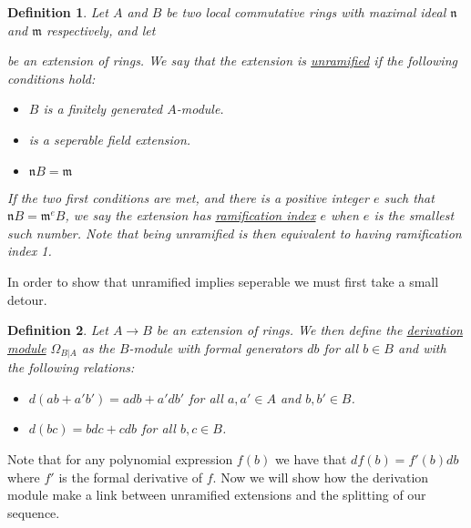 \documentclass[11pt, a4paper, english]{article}
\numberwithin{prop}{section}
\numberwithin{lemma}{section}
\numberwithin{theorem}{section}
\newtheorem{defin}{Definition}
\numberwithin{defin}{section}
\numberwithin{example}{section}
\begin{document}
\begin{defin}
Let $A$ and $B$ be two local commutative rings with maximal ideal $\mathfrak{n}$ and $\mathfrak{m}$ respectively, and let 
be an extension of rings. We say that the extension is \underline{unramified} if the following conditions hold:
\begin{itemize}
\item $B$ is a finitely generated $A$-module.
\item {}
is a seperable field extension.
\item $\mathfrak{n}B = \mathfrak{m}$
\end{itemize}
If the two first conditions are met, and there is a positive integer $e$ such that $\mathfrak{n} B = \mathfrak{m}^e B$, we say the extension has \underline{ramification index} $e$ when $e$ is the smallest such number. Note that being unramified is then equivalent to having ramification index 1. 
\end{defin}

In order to show that unramified implies seperable we must first take a small detour.

\begin{defin}
Let $A \to B$ be an extension of rings. We then define the \underline{derivation module} $\Omega_{B | A}$ as the $B$-module with formal generators $db$ for all $b \in B$ and with the following relations:
\begin{itemize}
\item[$A$-linearity:] $d(ab + a'b') = adb + a'db'$ for all $a, a' \in A$ and $b, b' \in B$.
\item[Leibniz rule:] $d(bc) = bdc + cdb$ for all $b,c \in B$.
\end{itemize} 
\end{defin}
Note that for any polynomial expression $f(b)$ we have that $df(b) = f'(b)db$ where $f'$ is the formal derivative of $f$. Now we will show how the derivation module make a link between unramified extensions and the splitting of our sequence.
\end{document}

